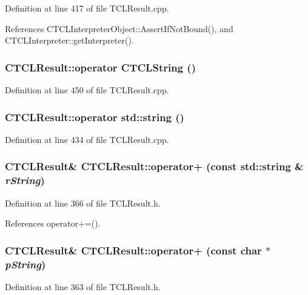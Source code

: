 Definition at line 417 of file TCLResult.cpp.

References CTCLInterpreter\-Object::Assert\-If\-Not\-Bound(), and CTCLInterpreter::get\-Interpreter().
\subsubsection{\setlength{\rightskip}{0pt plus 5cm}CTCLResult::operator {\bf CTCLString} ()}\label{classCTCLResult_a17}




Definition at line 450 of file TCLResult.cpp.
\subsubsection{\setlength{\rightskip}{0pt plus 5cm}CTCLResult::operator std::string ()}\label{classCTCLResult_a16}




Definition at line 434 of file TCLResult.cpp.
\subsubsection{\setlength{\rightskip}{0pt plus 5cm}CTCLResult\& CTCLResult::operator+ (const std::string \& {\em r\-String})\hspace{0.3cm}{\tt  [inline]}}\label{classCTCLResult_a11}




Definition at line 366 of file TCLResult.h.

References operator+=().
\subsubsection{\setlength{\rightskip}{0pt plus 5cm}CTCLResult\& CTCLResult::operator+ (const char $\ast$ {\em p\-String})\hspace{0.3cm}{\tt  [inline]}}\label{classCTCLResult_a10}




Definition at line 363 of file TCLResult.h.

